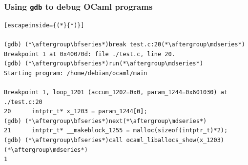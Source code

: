 \documentclass[xcolor={usenames,dvipsnames,svgnames,table}]{beamer}
\begin{document}
\begin{frame}[fragile]
  \frametitle{Using \lstinline{gdb} to debug OCaml programs}

  \begin{lstlisting}[escapeinside={(*}{*)}]

(gdb) (*\aftergroup\bfseries*)break test.c:20(*\aftergroup\mdseries*)
Breakpoint 1 at 0x40070d: file ./test.c, line 20.
(gdb) (*\aftergroup\bfseries*)run(*\aftergroup\mdseries*)
Starting program: /home/debian/ocaml/main

Breakpoint 1, loop_1201 (accum_1202=0x0, param_1244=0x601030) at ./test.c:20
20      intptr_t* x_1203 = param_1244[0];
(gdb) (*\aftergroup\bfseries*)next(*\aftergroup\mdseries*)
21      intptr_t* __makeblock_1255 = malloc(sizeof(intptr_t)*2);
(gdb) (*\aftergroup\bfseries*)call ocaml_liballocs_show(x_1203)(*\aftergroup\mdseries*)
1
\end{lstlisting}

\end{frame}


\end{document}
